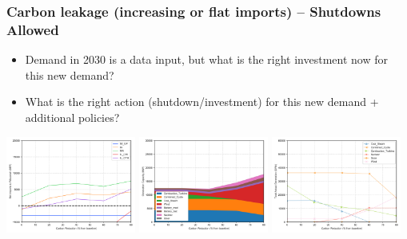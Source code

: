 \documentclass[xcolor=dvipsnames]{beamer}
\begin{document}
\begin{frame}
  \frametitle{Carbon leakage (increasing or flat imports) -- Shutdowns Allowed}
\begin{itemize}
  \item Demand in 2030 is a data input, but what is the right investment now for this new demand?
  \item What is the right action (shutdown/investment) for this new
    demand + additional policies? 
\end{itemize}


  \includegraphics[width=0.32\textwidth]{includes/leakage_shutdowns_agg_exim.png}
  \includegraphics[width=0.32\textwidth]{includes/leakage_shutdowns_agg_capacity_cntlreg.png}
  \includegraphics[width=0.32\textwidth]{includes/leakage_shutdowns_agg_generation_cntlreg.png}


\end{frame}
\end{document}
